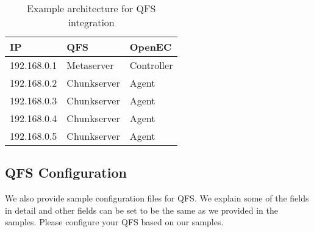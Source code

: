 \documentclass[letterpaper,12pt]{article}
\begin{document}
\begin{table}[h]
\centering
\footnotesize
\renewcommand{\arraystretch}{1.1}
\begin{tabular}{|l|l|l|}
\hline
IP & QFS & OpenEC \\
\hline
\hline
192.168.0.1 & Metaserver & Controller \\
\hline
192.168.0.2 & Chunkserver & Agent \\
\hline
192.168.0.3 & Chunkserver & Agent \\
\hline
192.168.0.4 & Chunkserver & Agent \\
\hline
192.168.0.5 & Chunkserver & Agent \\
\hline
\end{tabular}
\vspace{-3pt}
\caption{Example architecture for QFS integration}
\label{tab:qfsarch}
\end{table}

\subsection{QFS Configuration}

We also provide sample configuration files for QFS. We explain some of the fields in detail and 
other fields can be set to be the same as we provided in the samples. Please configure your QFS
based on our samples.
\end{document}

